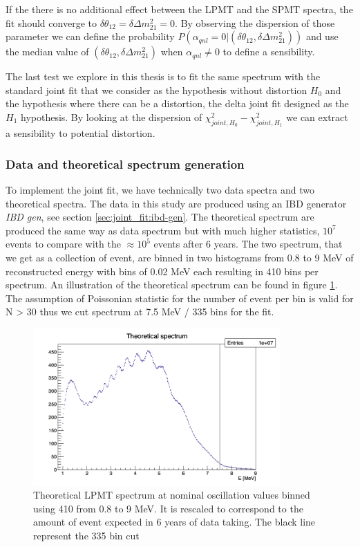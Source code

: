 \documentclass[../main.tex]{subfiles}
\begin{document}
If the there is no additional effect between the LPMT and the SPMT spectra, the fit should converge to $\delta \theta_{12} = \delta \Delta m^2_{21} = 0$. By observing the dispersion of those parameter we can define the probability $P(\alpha_{qnl} = 0 | (\delta \theta_{12}, \delta \Delta m^2_{21}))$ and use the median value of $(\delta \theta_{12}, \delta \Delta m^2_{21})$ when $\alpha_{qnl} \neq 0$ to define a sensibility.

The last test we explore in this thesis is to fit the same spectrum with the standard joint fit that we consider as the hypothesis without distortion $H_0$ and the hypothesis where there can be a distortion, the delta joint fit designed as the $H_1$ hypothesis. By looking at the dispersion of $\chi^2_{joint,H_0} - \chi^2_{joint,H_1}$ we can extract a sensibility to potential distortion.

\subsubsection{Data and theoretical spectrum generation}

To implement the joint fit, we have technically two data spectra and two theoretical spectra. The data in this study are produced using an IBD generator \textit{IBD gen}, see section \ref{sec:joint_fit:ibd-gen}. The theoretical spectrum are produced the same way as data spectrum but with much higher statistics, $10^7$ events to compare with the $\approx 10^5$ events after 6 years. The two spectrum, that we get as a collection of event, are binned in two histograms from 0.8 to 9 MeV of reconstructed energy with bins of 0.02 MeV each resulting in 410 bins per spectrum. An illustration of the theoretical spectrum can be found in figure \ref{fig:joint_fit:delta:theo}. The assumption of Poissonian statistic for the number of event per bin is valid for N > 30 thus we cut spectrum at 7.5 MeV / 335 bins for the fit.

\begin{figure}
  \centering
  \includegraphics[height=6cm]{images/joint_fit/theoretical_spectrum.png}
  \caption{Theoretical LPMT spectrum at nominal oscillation values binned using 410 from 0.8 to 9 MeV. It is rescaled to correspond to the amount of event expected in 6 years of data taking. The black line represent the 335 bin cut}
  \label{fig:joint_fit:delta:theo}
\end{figure}
\end{document}
